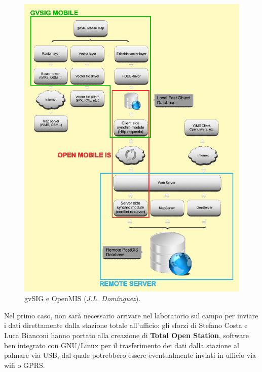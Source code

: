 \documentclass[portrait,final]{baposter}
\begin{document}
\begin{poster}
{        \begin{figure}
                \vspace{-20pt}
                \begin{center}
                        \includegraphics[scale=0.3]{generalscheme}
                \end{center}
                \vspace{-20pt}
                \caption{\small{gvSIG e OpenMIS (\emph{J.L. Dom\'{i}nguez}).}\label{generalscheme}}
                \vspace{-10pt}
         \end{figure}

	Nel primo caso, non sar\`{a} necessario arrivare nel laboratorio sul campo
	per inviare i dati direttamente dalla stazione totale all'ufficio:
	gli sforzi di Stefano Costa e Luca Bianconi hanno portato alla creazione
	di \textbf{Total Open Station},
	software ben integrato con GNU/Linux per il trasferimento dei dati dalla stazione al palmare via USB, dal quale potrebbero
	essere eventualmente inviati in ufficio via wifi o GPRS.

}
\end{poster}
\end{document}
